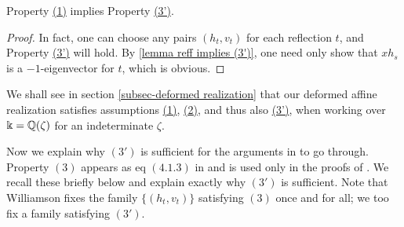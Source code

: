 \begin{lemma}  Property \hyperref[assumption 1]{(1)} implies Property \hyperref[assumption 3']{(3')}. \end{lemma}

\begin{proof} In fact, one can choose any pairs $(h_t, v_t)$ for each reflection $t$, and Property \hyperref[assumption 3']{(3')} will hold. By \cref{lemma reff implies (3')}, one need only show that $xh_s$ is a $-1$-eigenvector for $t$, which is obvious. \end{proof}

We shall see in section \ref{subsec-deformed realization} that our deformed affine realization satisfies assumptions \hyperref[assumption 1]{(1)}, \hyperref[assumption 2]{(2)}, and thus also \hyperref[assumption 3']{(3')}, when working over $\Bbbk=\mathbb{Q}(\zeta)$ for an indeterminate $\zeta.$ 

Now we explain why $\hyperref[assumption 3']{(3')}$ is sufficient for the arguments in \cite{WillSingular} to go through.  
Property $\hyperref[assumption 3]{(3)}$ appears as eq $(4.1.3)$ in \cite{WillSingular} and is used only in the proofs of \cite[Definition/Proposition 4.3.2, Definition/Proposition 5.0.1, and Lemma 7.3.4]{WillSingular}. We recall these briefly below and explain exactly why $\hyperref[assumption 3']{(3')}$ is sufficient. Note that Williamson fixes the family $\{(h_t, v_t)\}$ satisfying $\hyperref[assumption 3]{(3)}$ once and for all; we too fix a family satisfying $\hyperref[assumption 3']{(3')}$.

